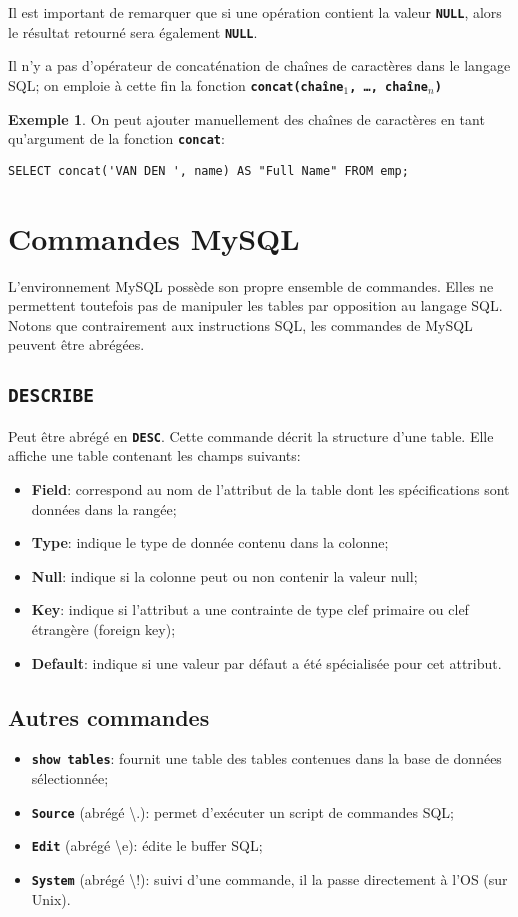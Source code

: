 \documentclass[a4paper, 12pt]{report}
\newcommand{\textSQL}[1]{\texttt{\textbf{#1}}}
\theoremstyle{definition} \newtheorem{ex}{Exemple}
\begin{document}
Il est important de remarquer que si une opération contient la valeur \textSQL{NULL}, alors le résultat retourné sera également \textSQL{NULL}.

Il n'y a pas d'opérateur de concaténation de chaînes de caractères dans le langage SQL; on emploie à cette fin la fonction \textSQL{concat(chaîne$_1$, \ldots, chaîne$_n$)}

\begin{ex}On peut ajouter manuellement des chaînes de caractères en tant qu'argument de la fonction \textSQL{concat}:
\begin{lstlisting}[frame=single]
SELECT concat('VAN DEN ', name) AS "Full Name" FROM emp;
\end{lstlisting}
\end{ex}

\section{Commandes MySQL}
L'environnement MySQL possède son propre ensemble de commandes. Elles ne permettent toutefois pas de manipuler les tables par opposition au langage SQL. Notons que contrairement aux instructions SQL, les commandes de MySQL peuvent être abrégées.
\subsection{\textSQL{DESCRIBE}}
Peut être abrégé en \textSQL{DESC}. Cette commande décrit la structure d'une table. Elle affiche une table contenant les champs suivants:
	\begin{itemize}
		\item \textbf{Field}: correspond au nom de l'attribut de la table dont les spécifications sont données dans la rangée;
		\item \textbf{Type}: indique le type de donnée contenu dans la colonne;
		\item \textbf{Null}: indique si la colonne peut ou non contenir la valeur null;
		\item \textbf{Key}: indique si l'attribut a une contrainte de type clef primaire ou clef étrangère (foreign key);
		\item \textbf{Default}: indique si une valeur par défaut a été spécialisée pour cet attribut.
	\end{itemize}
\subsection{Autres commandes}
\begin{itemize}
		\item \textSQL{show tables}: fournit une table des tables contenues dans la base de données sélectionnée;
		\item \textSQL{Source} (abrégé \textbackslash{}.): permet d'exécuter un script de commandes SQL;
		\item \textSQL{Edit} (abrégé \textbackslash{}e): édite le buffer SQL;
		\item \textSQL{System} (abrégé \textbackslash{}!): suivi d'une commande, il la passe directement à l'OS (sur Unix).
	\end{itemize}
	
\end{document}
